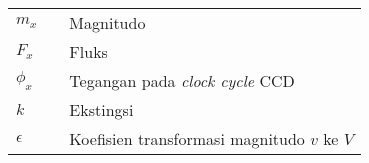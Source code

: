 \simbol

\begin{flushleft}\vspace{0.5cm}
\begin{tabular}{p{.5cm}p{2pt}l}
     $m_x$ &  & Magnitudo\\
     $F_x$ &  & Fluks\\
     $\phi_x$ & & Tegangan pada \emph{clock cycle} CCD\\
     $k$ & & Ekstingsi\\
     $\epsilon$ & & Koefisien transformasi magnitudo $v$ ke $V$ \\


\end{tabular}
\end{flushleft}
